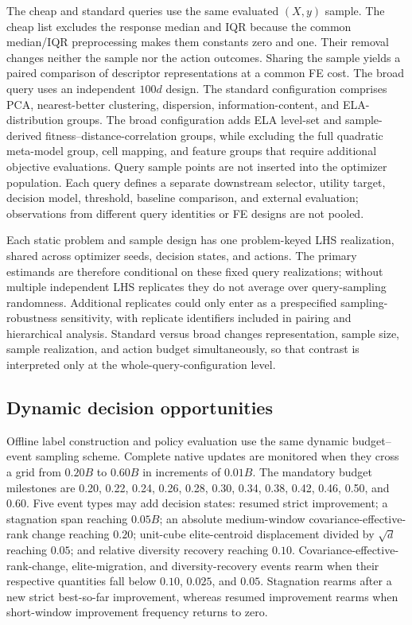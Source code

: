 The cheap and standard queries use the same evaluated $(X,y)$ sample.  The
cheap list excludes the response median and IQR because the common median/IQR
preprocessing makes them constants zero and one.  Their removal changes neither
the sample nor the action outcomes.  Sharing the sample yields
a paired comparison of descriptor representations at a common FE cost.  The
broad query uses an independent $100d$ design.  The standard configuration
comprises PCA, nearest-better clustering, dispersion, information-content, and
ELA-distribution groups.  The broad configuration adds ELA level-set and
sample-derived fitness--distance-correlation groups, while excluding the full
quadratic meta-model group, cell mapping, and feature groups that require
additional objective evaluations.  Query sample points are not inserted into
the optimizer population.  Each query defines a separate downstream selector,
utility target, decision model, threshold, baseline comparison, and external
evaluation; observations from different query identities or FE designs are not
pooled.

Each static problem and sample design has one problem-keyed LHS realization,
shared across optimizer seeds, decision states, and actions.  The primary
estimands are therefore conditional on these fixed query realizations; without
multiple independent LHS replicates they do not average over query-sampling
randomness.  Additional replicates could only enter as a prespecified
sampling-robustness sensitivity, with replicate identifiers included in pairing
and hierarchical analysis.  Standard versus broad changes representation,
sample size, sample realization, and action budget simultaneously, so that
contrast is interpreted only at the whole-query-configuration level.

\subsection{Dynamic decision opportunities}

Offline label construction and policy evaluation use the same dynamic
budget--event sampling scheme.  Complete native updates are monitored when they
cross a grid from $0.20B$ to $0.60B$ in increments of $0.01B$.  The mandatory
budget milestones are 0.20, 0.22, 0.24, 0.26, 0.28, 0.30, 0.34, 0.38, 0.42,
0.46, 0.50, and 0.60.  Five event types may add decision states: resumed strict
improvement; a stagnation span reaching $0.05B$; an absolute medium-window
covariance-effective-rank change reaching $0.20$; unit-cube elite-centroid
displacement divided by $\sqrt{d}$ reaching $0.05$; and relative diversity
recovery reaching $0.10$.  Covariance-effective-rank-change, elite-migration,
and diversity-recovery events rearm when their respective quantities fall below
$0.10$, $0.025$, and $0.05$.  Stagnation rearms after a new strict best-so-far
improvement, whereas resumed improvement rearms when short-window improvement
frequency returns to zero.

